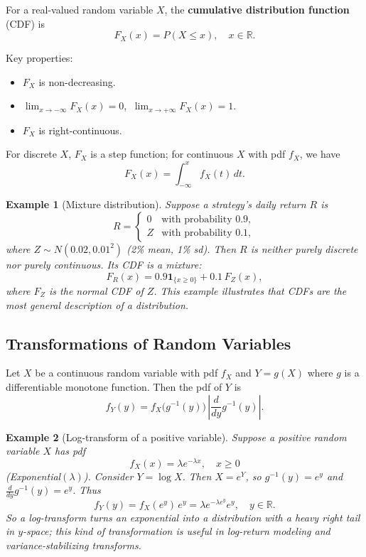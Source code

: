 \documentclass[11pt,a4paper]{article}
\newtheorem{example}{Example}[section]
\begin{document}
For a real-valued random variable $X$, the \textbf{cumulative distribution function} (CDF) is
\[
F_X(x) = P(X \le x),\quad x \in \mathbb{R}.
\]

Key properties:
\begin{itemize}
    \item $F_X$ is non-decreasing.
    \item $\lim_{x\to -\infty} F_X(x) = 0$, $\ \lim_{x\to +\infty} F_X(x) = 1$.
    \item $F_X$ is right-continuous.
\end{itemize}

For discrete $X$, $F_X$ is a step function; for continuous $X$ with pdf $f_X$, we have
\[
F_X(x) = \int_{-\infty}^x f_X(t)\,dt.
\]

\begin{example}[Mixture distribution]
Suppose a strategy's daily return $R$ is
\[
R =
\begin{cases}
0 & \text{with probability } 0.9,\\
Z & \text{with probability } 0.1,
\end{cases}
\]
where $Z \sim N(0.02, 0.01^2)$ (2\% mean, 1\% sd). 
Then $R$ is neither purely discrete nor purely continuous. 
Its CDF is a mixture:
\[
F_R(x) = 0.9 \mathbf{1}_{\{x \ge 0\}} + 0.1\, F_Z(x),
\]
where $F_Z$ is the normal CDF of $Z$. 
This example illustrates that CDFs are the most general description of a distribution.

\end{example}

\subsection{Transformations of Random Variables}

Let $X$ be a continuous random variable with pdf $f_X$ and $Y = g(X)$ where $g$ is a differentiable monotone function. 
Then the pdf of $Y$ is
\[
f_Y(y) = f_X\big(g^{-1}(y)\big)\,\left|\frac{d}{dy}g^{-1}(y)\right|.
\]

\begin{example}[Log-transform of a positive variable]
Suppose a positive random variable $X$ has pdf
\[
f_X(x) = \lambda e^{-\lambda x}, \quad x \ge 0
\]
(Exponential$(\lambda)$). 
Consider $Y = \log X$. 
Then $X = e^Y$, so $g^{-1}(y) = e^y$ and $\frac{d}{dy}g^{-1}(y) = e^y$. 
Thus
\[
f_Y(y) = f_X(e^y)\, e^y 
= \lambda e^{-\lambda e^y} e^y,\quad y \in \mathbb{R}.
\]
So a log-transform turns an exponential into a distribution with a heavy right tail in $y$-space; this kind of transformation is useful in log-return modeling and variance-stabilizing transforms.

\end{example}
\end{document}
